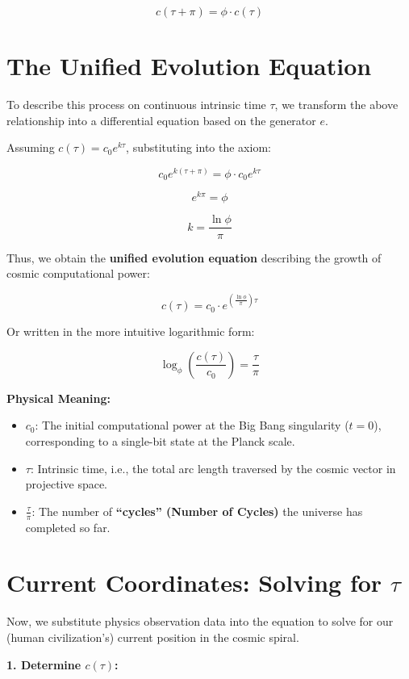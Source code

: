 \documentclass[11pt,a4paper,twoside]{book}
\begin{document}
$$c(\tau + \pi) = \phi \cdot c(\tau)$$

\section{The Unified Evolution Equation}

To describe this process on continuous intrinsic time $\tau$, we transform the above relationship into a differential equation based on the generator $e$.

Assuming $c(\tau) = c_0 e^{k\tau}$, substituting into the axiom:

$$c_0 e^{k(\tau+\pi)} = \phi \cdot c_0 e^{k\tau}$$

$$e^{k\pi} = \phi$$

$$k = \frac{\ln \phi}{\pi}$$

Thus, we obtain the \textbf{unified evolution equation} describing the growth of cosmic computational power:

$$c(\tau) = c_0 \cdot e^{\left( \frac{\ln \phi}{\pi} \right) \tau}$$

Or written in the more intuitive logarithmic form:

$$\log_\phi \left( \frac{c(\tau)}{c_0} \right) = \frac{\tau}{\pi}$$

\textbf{Physical Meaning:}

\begin{itemize}
\item \textbf{$c_0$}: The initial computational power at the Big Bang singularity ($t=0$), corresponding to a single-bit state at the Planck scale.

\item \textbf{$\tau$}: Intrinsic time, i.e., the total arc length traversed by the cosmic vector in projective space.

\item \textbf{$\frac{\tau}{\pi}$}: The number of \textbf{``cycles'' (Number of Cycles)} the universe has completed so far.
\end{itemize}

\section{Current Coordinates: Solving for $\tau$}

Now, we substitute physics observation data into the equation to solve for our (human civilization's) current position in the cosmic spiral.

\textbf{1. Determine $c(\tau)$:}
\end{document}
